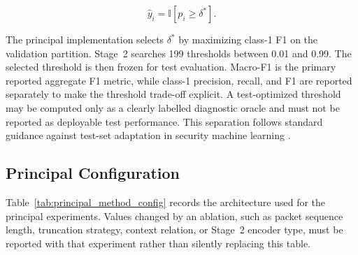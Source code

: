\begin{equation}
    \widehat{y}_i=\mathbb{I}[p_i\geq\delta^{*}].
    \label{eq:method_decision_rule}
\end{equation}

The principal implementation selects $\delta^{*}$ by maximizing class-1 F1 on
the validation partition. Stage~2 searches 199 thresholds between 0.01 and
0.99. The selected threshold is then frozen for test evaluation. Macro-F1 is
the primary reported aggregate F1 metric, while class-1 precision, recall, and
F1 are reported separately to make the threshold trade-off explicit. A
test-optimized threshold may be computed only as a clearly labelled diagnostic
oracle and must not be reported as deployable test performance. This separation
follows standard guidance against test-set adaptation in security machine
learning \cite{Arp2022DosDonts}.

\subsection{Principal Configuration}
\label{subsec:principal_configuration}

Table~\ref{tab:principal_method_config} records the architecture used for the
principal experiments. Values changed by an ablation, such as packet sequence
length, truncation strategy, context relation, or Stage~2 encoder type, must be
reported with that experiment rather than silently replacing this table.

